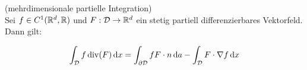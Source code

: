 \begin{Folgerung}(mehrdimensionale partielle Integration) \\
	\label{n_pI}
	Sei $ f \in C^1(\mathbb{R}^d, \mathbb{R})$ und $ F : \mathcal{D} \to \mathbb{R}^d $ ein stetig partiell differenzierbares Vektorfeld.
	Dann gilt:
	
	\begin{align*}
		\int_{\mathcal{D}} f \operatorname{div} ( F) \, \mathrm{d} x = \int_{\partial \mathcal{D}} f F \cdot n \, \mathrm{d} a
		- \int_{\mathcal{D}}  F \cdot \nabla f \, \mathrm{d} x
	\end{align*}
\end{Folgerung}





